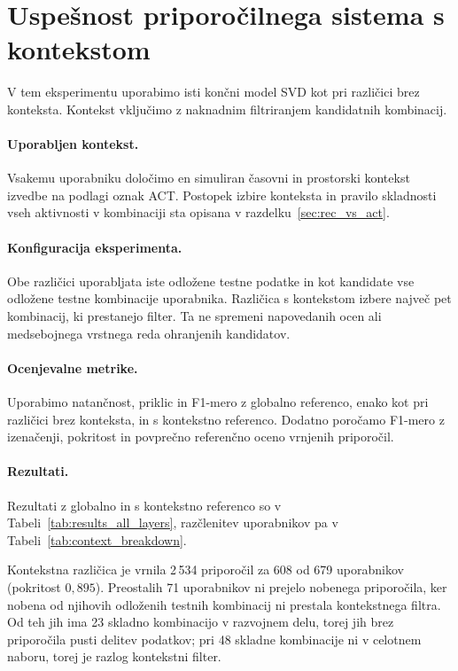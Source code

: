 \documentclass[a4paper,twoside,openright,12pt,slovene]{book}
\begin{document}
\section{Uspešnost priporočilnega sistema s kontekstom} 
\label{sec:results_with_context}

V tem eksperimentu uporabimo isti končni model SVD kot pri
različici brez konteksta. Kontekst vključimo z naknadnim
filtriranjem kandidatnih kombinacij.

\paragraph{Uporabljen kontekst.}
Vsakemu uporabniku določimo en simuliran časovni in prostorski
kontekst izvedbe na podlagi oznak ACT. Postopek izbire konteksta
in pravilo skladnosti vseh aktivnosti v kombinaciji sta opisana
v razdelku~\ref{sec:rec_vs_act}.

\paragraph{Konfiguracija eksperimenta.}
Obe različici uporabljata iste odložene testne podatke in
kot kandidate vse odložene testne kombinacije uporabnika.
Različica s kontekstom izbere največ pet kombinacij, ki prestanejo
filter. Ta ne spremeni napovedanih ocen ali medsebojnega vrstnega
reda ohranjenih kandidatov.

\paragraph{Ocenjevalne metrike.}
Uporabimo natančnost, priklic in F1-mero z globalno referenco,
enako kot pri različici brez konteksta, in s kontekstno referenco.
Dodatno poročamo F1-mero z izenačenji, pokritost in
povprečno referenčno oceno vrnjenih priporočil.

\paragraph{Rezultati.}
Rezultati z globalno in s kontekstno referenco so v
Tabeli~\ref{tab:results_all_layers}, razčlenitev uporabnikov pa v
Tabeli~\ref{tab:context_breakdown}.

Kontekstna različica je vrnila 2\,534 priporočil za 608
od 679 uporabnikov (pokritost $0{,}895$).
Preostalih 71 uporabnikov ni prejelo nobenega priporočila,
ker nobena od njihovih odloženih testnih kombinacij
ni prestala kontekstnega filtra. Od teh jih ima 23 skladno kombinacijo
v razvojnem delu, torej jih brez priporočila pusti delitev podatkov;
pri 48 skladne kombinacije ni v celotnem naboru, torej je razlog
kontekstni filter.
\end{document}
